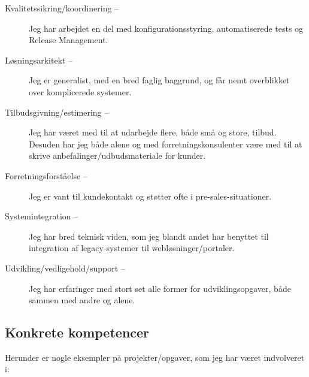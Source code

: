 \documentclass[a4paper,11pt]{article}
\begin{document}
\begin{description}

  \item[Kvalitetssikring/koordinering --] Jeg har arbejdet en del
    med konfigurationsstyring, automatiserede tests og Release
    Management.

  \item[Løsningsarkitekt --] Jeg er generalist, med en bred faglig
    baggrund, og får nemt overblikket over komplicerede systemer.

  \item[Tilbudsgivning/estimering --] Jeg har været med til at
    udarbejde flere, både små og store, tilbud. Desuden har jeg både
    alene og med forretningskonsulenter være med til at skrive
    anbefalinger/udbudsmateriale for kunder.

  \item[Forretningsforståelse --] Jeg er vant til kundekontakt og
    støtter ofte i pre-sales-situationer.

  \item[Systemintegration --] Jeg har bred teknisk viden, som jeg
    blandt andet har benyttet til integration af legacy-systemer til
    webløsninger/portaler.

  \item[Udvikling/vedligehold/support --] Jeg har erfaringer med
    stort set alle former for udviklingsopgaver, både sammen med
    andre og alene.

\end{description}

\subsection*{Konkrete kompetencer}

Herunder er nogle eksempler på projekter/opgaver, som jeg har været
indvolveret i:
\end{document}
